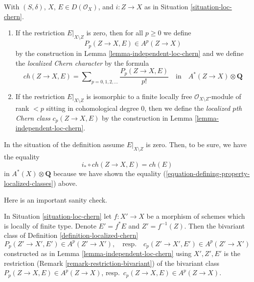 \begin{definition}
\label{definition-localized-chern}
With $(S, \delta)$, $X$, $E \in D(\mathcal{O}_X)$, and $i : Z \to X$ as in
Situation \ref{situation-loc-chern}.
\begin{enumerate}
\item If the restriction $E|_{X \setminus Z}$ is zero, then for all
$p \geq 0$ we define
$$
P_p(Z \to X, E) \in A^p(Z \to X)
$$
by the construction in Lemma \ref{lemma-independent-loc-chern}
and we define the {\it localized Chern character} by the formula
$$
ch(Z \to X, E) =
\sum\nolimits_{p = 0, 1, 2, \ldots} \frac{P_p(Z \to X, E)}{p!}
\quad\text{in}\quad A^*(Z \to X) \otimes \mathbf{Q}
$$
\item If the restriction $E|_{X \setminus Z}$ is isomorphic to a
finite locally free $\mathcal{O}_{X \setminus Z}$-module of rank $< p$
sitting in cohomological degree $0$, then we define the
{\it localized $p$th Chern class} $c_p(Z \to X, E)$ by the construction
in Lemma \ref{lemma-independent-loc-chern}.
\end{enumerate}
\end{definition}

\noindent
In the situation of the definition assume $E|_{X \setminus Z}$ is zero.
Then, to be sure, we have the equality
$$
i_* \circ ch(Z \to X, E) = ch(E)
$$
in $A^*(X) \otimes \mathbf{Q}$ because we have shown the
equality (\ref{equation-defining-property-localized-classes}) above.

\medskip\noindent
Here is an important sanity check.

\begin{lemma}
\label{lemma-base-change-loc-chern}
In Situation \ref{situation-loc-chern}
let $f : X' \to X$ be a morphism of schemes which is locally of finite type.
Denote $E' = f^*E$ and $Z' = f^{-1}(Z)$. Then the bivariant class
of Definition \ref{definition-localized-chern}
$$
P_p(Z' \to X', E') \in A^p(Z' \to X'),
\quad\text{resp.}\quad
c_p(Z' \to X', E') \in A^p(Z' \to X')
$$
constructed as in Lemma \ref{lemma-independent-loc-chern}
using $X', Z', E'$ is the restriction
(Remark \ref{remark-restriction-bivariant}) of the
bivariant class $P_p(Z \to X, E) \in A^p(Z \to X)$,
resp.\ $c_p(Z \to X, E) \in A^p(Z \to X)$.
\end{lemma}

